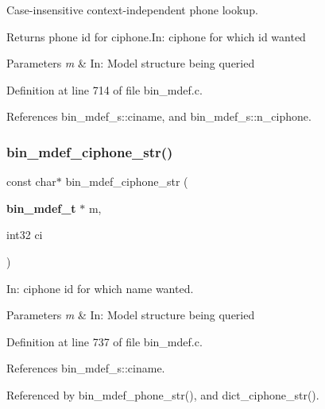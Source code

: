 Case-\/insensitive context-\/independent phone lookup. 

\begin{DoxyReturn}{Returns}
phone id for ciphone.\+In\+: ciphone for which id wanted 
\end{DoxyReturn}

\begin{DoxyParams}{Parameters}
{\em m} & In\+: Model structure being queried \\
\hline
\end{DoxyParams}


Definition at line 714 of file bin\+\_\+mdef.\+c.



References bin\+\_\+mdef\+\_\+s\+::ciname, and bin\+\_\+mdef\+\_\+s\+::n\+\_\+ciphone.

\mbox{\label{bin__mdef_8h_a9498ffff0caf3965060b8a549348be9b}} 
\subsubsection{bin\+\_\+mdef\+\_\+ciphone\+\_\+str()}
{\footnotesize\ttfamily const char$\ast$ bin\+\_\+mdef\+\_\+ciphone\+\_\+str (\begin{DoxyParamCaption}\item[{\textbf{ bin\+\_\+mdef\+\_\+t} $\ast$}]{m,  }\item[{int32}]{ci }\end{DoxyParamCaption})}



In\+: ciphone id for which name wanted. 


\begin{DoxyParams}{Parameters}
{\em m} & In\+: Model structure being queried \\
\hline
\end{DoxyParams}


Definition at line 737 of file bin\+\_\+mdef.\+c.



References bin\+\_\+mdef\+\_\+s\+::ciname.



Referenced by bin\+\_\+mdef\+\_\+phone\+\_\+str(), and dict\+\_\+ciphone\+\_\+str().

\mbox{\label{bin__mdef_8h_a99cd766df3a6a74eab9e316586189d54}} 
